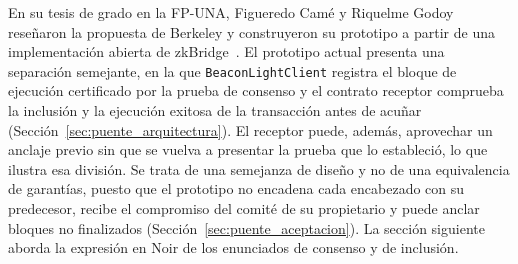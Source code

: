 \begin{sloppypar}
En su tesis de grado en la FP-UNA, Figueredo Camé y Riquelme Godoy reseñaron la propuesta de
Berkeley y construyeron su prototipo a partir de una implementación abierta de
zkBridge~\cite{figueredo2026zkbridge}. El prototipo actual presenta una
separación semejante, en la que \texttt{BeaconLightClient} registra el bloque de ejecución
certificado por la prueba de consenso y el contrato receptor comprueba la inclusión y la ejecución
exitosa de la transacción antes de acuñar (Sección~\ref{sec:puente_arquitectura}). El receptor
puede, además, aprovechar un anclaje previo sin que se vuelva a presentar la prueba que lo
estableció, lo que ilustra esa división. Se trata de una semejanza de diseño y no de una equivalencia de garantías, puesto que
el prototipo no encadena cada encabezado con su predecesor, recibe el compromiso del comité de su
propietario y puede anclar bloques no finalizados (Sección~\ref{sec:puente_aceptacion}). La sección siguiente aborda la expresión en Noir de los
enunciados de consenso y de inclusión.
\end{sloppypar}
